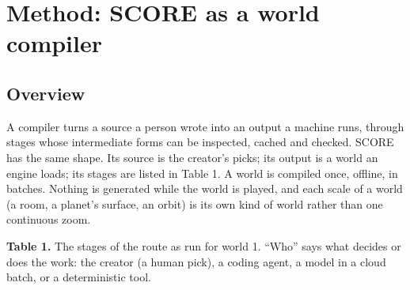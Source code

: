 \section{Method: SCORE as a world compiler}\label{method-score-as-a-world-compiler}

\subsection{Overview}\label{overview}

A compiler turns a source a person wrote into an output a machine runs, through stages whose intermediate forms can be inspected, cached and checked. SCORE has the same shape. Its source is the creator's picks; its output is a world an engine loads; its stages are listed in Table 1. A world is compiled once, offline, in batches. Nothing is generated while the world is played, and each scale of a world (a room, a planet's surface, an orbit) is its own kind of world rather than one continuous zoom.

\textbf{Table 1.} The stages of the route as run for world 1. ``Who'' says what decides or does the work: the creator (a human pick), a coding agent, a model in a cloud batch, or a deterministic tool.


